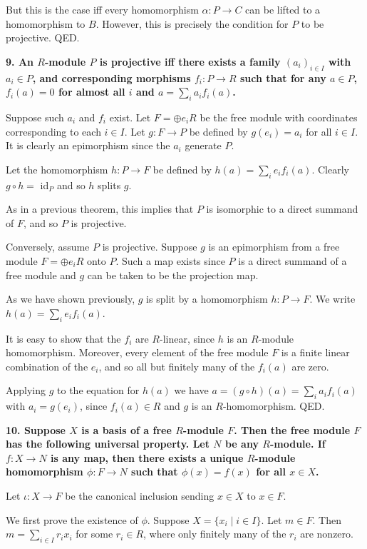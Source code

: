 \documentclass[12pt]{article}
\begin{document}
But this is the case iff every homomorphism $\alpha : P \to C$ can be lifted to a homomorphism to $B$. However, this is precisely the condition for $P$ to be projective. QED.

\textbf{9. An $R$-module $P$ is projective iff there exists a family $(a_i)_{i\in I}$ with $a_i \in P$, and corresponding morphisms $f_i : P \to R$ such that for any $a \in P$, $f_i(a) = 0$ for almost all $i$ and $a = \sum_i a_if_i(a)$.}

Suppose such $a_i$ and $f_i$ exist. Let $F = \oplus e_i R$ be the free module with coordinates corresponding to each $i \in I$. Let $g : F \to P$ be defined by $g(e_i) = a_i$ for all $i \in I$. It is clearly an epimorphism since the $a_i$ generate $P$.

Let the homomorphism $h : P \to F$ be defined by $h(a) = \sum_i e_if_i(a)$. Clearly $g\circ h =$ id$_P$ and so $h$ splits $g$.

As in a previous theorem, this implies that $P$ is isomorphic to a direct summand of $F$, and so $P$ is projective.

Conversely, assume $P$ is projective. Suppose $g$ is an epimorphism from a free module $F = \oplus e_i R$ onto $P$. Such a map exists since $P$ is a direct summand of a free module and $g$ can be taken to be the projection map.

As we have shown previously, $g$ is split by a homomorphism $h : P \to F$. We write $h(a) = \sum_i e_i f_i(a)$.

It is easy to show that the $f_i$ are $R$-linear, since $h$ is an $R$-module homomorphism. Moreover, every element of the free module $F$ is a finite linear combination of the $e_i$, and so all but finitely many of the $f_i(a)$ are zero.

Applying $g$ to the equation for $h(a)$ we have $a = (g\circ h)(a) = \sum_i a_i f_i(a)$ with $a_i = g(e_i)$, since $f_i(a) \in R$ and $g$ is an $R$-homomorphism. QED.

\textbf{10. Suppose $X$ is a basis of a free $R$-module $F$. Then the free module $F$ has the following universal property. Let $N$ be any $R$-module. If $f : X \to N$ is any map, then there exists a unique $R$-module homomorphism $\phi : F \to N$ such that $\phi(x) = f(x)$ for all $x \in X$.}

Let $\iota : X \to F$ be the canonical inclusion sending $x \in X$ to $x \in F$.

We first prove the existence of $\phi$. Suppose $X = \{x_i \;|\; i \in I\}$. Let $m \in F$. Then $m = \sum_{i\in I} r_ix_i$ for some $r_i \in R$, where only finitely many of the $r_i$ are nonzero.
\end{document}
